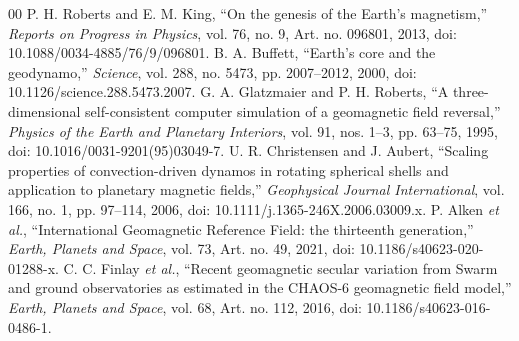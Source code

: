 \documentclass[conference]{IEEEtran}
\begin{document}
\begin{thebibliography}{00}
 P. H. Roberts and E. M. King, ``On the genesis of the Earth's magnetism,'' \textit{Reports on Progress in Physics}, vol. 76, no. 9, Art. no. 096801, 2013, doi: 10.1088/0034-4885/76/9/096801.
 B. A. Buffett, ``Earth's core and the geodynamo,'' \textit{Science}, vol. 288, no. 5473, pp. 2007--2012, 2000, doi: 10.1126/science.288.5473.2007.
 G. A. Glatzmaier and P. H. Roberts, ``A three-dimensional self-consistent computer simulation of a geomagnetic field reversal,'' \textit{Physics of the Earth and Planetary Interiors}, vol. 91, nos. 1--3, pp. 63--75, 1995, doi: 10.1016/0031-9201(95)03049-7.
 U. R. Christensen and J. Aubert, ``Scaling properties of convection-driven dynamos in rotating spherical shells and application to planetary magnetic fields,'' \textit{Geophysical Journal International}, vol. 166, no. 1, pp. 97--114, 2006, doi: 10.1111/j.1365-246X.2006.03009.x.
 P. Alken \textit{et al.}, ``International Geomagnetic Reference Field: the thirteenth generation,'' \textit{Earth, Planets and Space}, vol. 73, Art. no. 49, 2021, doi: 10.1186/s40623-020-01288-x.
 C. C. Finlay \textit{et al.}, ``Recent geomagnetic secular variation from Swarm and ground observatories as estimated in the CHAOS-6 geomagnetic field model,'' \textit{Earth, Planets and Space}, vol. 68, Art. no. 112, 2016, doi: 10.1186/s40623-016-0486-1.
\end{thebibliography}
\end{document}
